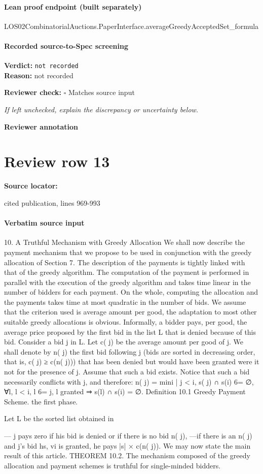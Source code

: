\documentclass[10pt]{article}
\newcommand{\reviewerbox}{%
  \par\noindent\fbox{\parbox{0.96\linewidth}{\rule{0pt}{0.38in}}}\par
}
\newcommand{\reviewmatch}[1]{%
  \par\noindent\textbf{Reviewer check:} $\square$\; #1\par
  \noindent\emph{If left unchecked, explain the discrepancy or uncertainty below.}\par
}
\begin{document}
\paragraph{Lean proof endpoint (built separately)}\begin{ReviewVerbatim}
LOS02CombinatorialAuctions.PaperInterface.averageGreedyAcceptedSet_formula
\end{ReviewVerbatim}

\paragraph{Recorded source-to-Spec screening}
\textbf{Verdict:} \texttt{not recorded}
\\
\textbf{Reason:} not recorded
\reviewmatch{Matches source input}
\noindent\textbf{Reviewer annotation}\par
\reviewerbox
\clearpage
\hypertarget{source-claim-2217276c338da214}{}
\section*{Review row 13}
\textbf{Source locator:} {\footnotesize\raggedright cited publication, lines 969-\allowbreak{}993\par}
\paragraph{Verbatim source input}
\begin{ReviewVerbatim}
10. A Truthful Mechanism with Greedy Allocation
We shall now describe the payment mechanism that we propose to be used in
conjunction with the greedy allocation of Section 7. The description of the payments
is tightly linked with that of the greedy algorithm. The computation of the payment
is performed in parallel with the execution of the greedy algorithm and takes time
linear in the number of bidders for each payment. On the whole, computing the
allocation and the payments takes time at most quadratic in the number of bids.
We assume that the criterion used is average amount per good, the adaptation
to most other suitable greedy allocations is obvious. Informally, a bidder pays, per
good, the average price proposed by the first bid in the list L that is denied because
of this bid. Consider a bid j in L. Let c( j) be the average amount per good of j. We
shall denote by n( j) the first bid following j (bids are sorted in decreasing order,
that is, c( j) ≥ c(n( j))) that has been denied but would have been granted were it
not for the presence of j. Assume that such a bid exists. Notice that such a bid
necessarily conflicts with j, and therefore:
n( j) = min{i | j < i, s( j) ∩ s(i) 6= ∅, ∀l, l < i, l 6= j, l granted ⇒ s(l) ∩ s(i) = ∅}.
Definition 10.1 Greedy Payment Scheme.
the first phase.

Let L be the sorted list obtained in

— j pays zero if his bid is denied or if there is no bid n( j),
—if there is an n( j) and j’s bid hs, vi is granted, he pays |s| × c(n( j)).
We may now state the main result of this article.
THEOREM 10.2. The mechanism composed of the greedy allocation and payment schemes is truthful for single-minded bidders.
\end{ReviewVerbatim}
\end{document}
